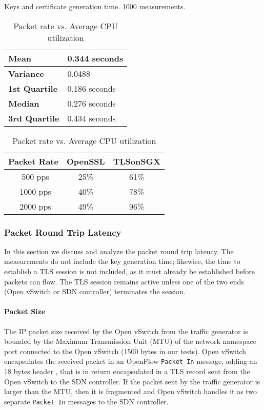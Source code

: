 {\begin{table}[tb]
	\parbox{.40\linewidth}{
		\centering
		\caption{Keys and certificate generation time. 1000 measurements.}
		\label{table:key_generation}
		\begin{tabular}{|l|l|}
			\hline
			\textbf{Mean}             &     0.344 seconds        \\ \hline
			\textbf{Variance}             &     0.0488        \\ \hline
			\textbf{1st Quartile} &     0.186 seconds       \\ \hline
			\textbf{Median}       &      0.276 seconds      \\ \hline
			\textbf{3rd Quartile}       &      0.434 seconds      \\ \hline
		\end{tabular}
	}
	\hfill
	\parbox{.55\linewidth}{
		\centering
		\caption{Packet rate vs. Average CPU utilization}
		\label{table:cpu_utilization}
		\renewcommand{\arraystretch}{}%
		\begin{tabular}{|c|c|c|}
			\hline
			\textbf{Packet Rate}  &  \textbf{ OpenSSL} & \textbf{TLSonSGX}      \\ \hline
			\ 500 pps &     25\% & 61\%        \\ \hline
			\ 1000 pps            &     40\% & 78\%        \\ \hline
			\ 2000 pps &     49\% & 96\%       \\ \hline
		\end{tabular}
	}
\end{table}

\subsubsection{Packet Round Trip Latency}
\label{subsubsec:results_latency}
In this section we discuss and analyze the packet round trip latency.
The measurements do not include the key generation time;
likewise, the time to establish a TLS session is not included, as it must already be established before packets can flow.
The TLS session remains active unless one of the two ends (Open vSwitch or SDN controller) terminates the session.

\paragraph{Packet Size}
\label{sec:packet_size}
The IP packet size received by the Open vSwitch from the traffic generator is bounded by the Maximum Transmission Unit (MTU) of the network namespace port connected to the Open vSwitch (1500 bytes in our tests).
Open vSwitch encapsulates the received packet 
in an OpenFlow \texttt{Packet In} message, adding an 18 bytes header \cite{openflowswitch}, that is in return encapsulated in a TLS record sent from the Open vSwitch to the SDN controller.
If the packet sent by the traffic generator is larger than the MTU, then it is fragmented and Open vSwitch handles it as two separate \texttt{Packet In} messages to the SDN controller. 

}
